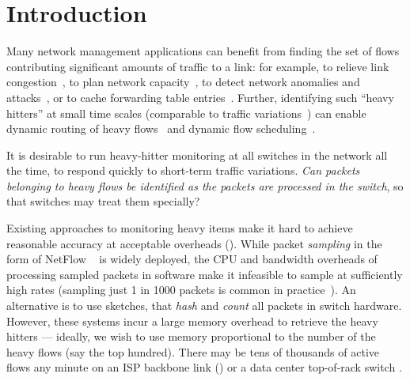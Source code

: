 \section{Introduction}
\label{sec:intro}


Many network management applications can benefit from finding the set of flows
contributing significant amounts of traffic to a link: for example, to relieve
link congestion~\cite{microTE}, to plan network
capacity~\cite{att-deriving-traffic-demands}, to detect network anomalies and
attacks~\cite{network-wide-anomalies}, or to cache forwarding table
entries~\cite{LossyToN}.
%
Further, identifying such ``heavy hitters'' at small time scales (comparable to
traffic variations~\cite{hedera, microTE}) can enable dynamic routing of heavy
flows~\cite{devoflow, planck} and dynamic flow scheduling~\cite{pifo}.

It is desirable to run heavy-hitter monitoring at all switches in the network
all the time, to respond quickly to short-term traffic variations. {\em Can
  packets belonging to heavy flows be identified as the packets are processed in
  the switch}, so that switches may treat them specially?

Existing approaches to monitoring heavy items make it hard to achieve
reasonable accuracy at acceptable overheads (). While packet
{\em sampling} in the form of NetFlow ~\cite{cisco-netflow} is widely deployed,
the CPU and bandwidth overheads of processing sampled packets in software make
it infeasible to sample at sufficiently high rates (sampling just 1 in 1000
packets is common in practice~\cite{sflow-sampling-rate}). An alternative
is to use sketches, \eg \cite{cormode2005improved, li2016flowradar,
  yu2013software, univmon} that {\em hash} and {\em count} all packets in switch
hardware. However, these systems incur a large memory overhead to retrieve the heavy hitters
--- ideally, we wish to use memory proportional to the number of the heavy flows (say the top hundred). There may be tens of thousands of
active flows any minute on an ISP backbone link () or a data
center top-of-rack switch \cite{theo-dc-traffic}.

